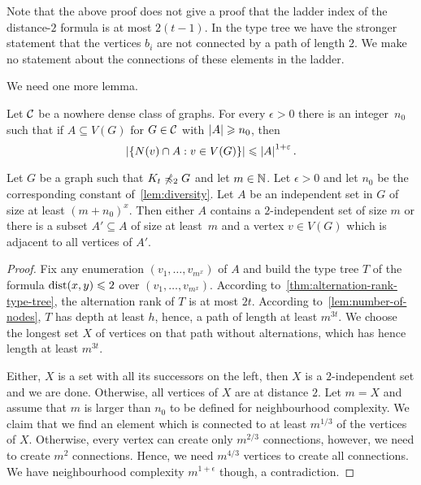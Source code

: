 Note that the above proof does not give a proof that the ladder
index of the distance-$2$ formula is at most $2(t-1)$. In the type
tree we have the stronger statement that the vertices $b_i$
are not connected by a path of length $2$. 
We make no statement about the connections
of these elements in the ladder. 

We need one more lemma. 

\begin{lemma}\label{lem:diversity}
  Let $\mathcal{C}$ be a nowhere dense class of graphs. For every
  $\epsilon>0$ there is an integer~$n_0$ such that if
  $A\subseteq V(G)$ for $G\in \mathcal{C}$ with $\left\lvert A\right\rvert\geqslant n_0$,
  then \[\left\lvert\{N(v)\cap A : v\in V(G)\}\right\rvert\leqslant \left\lvert A\right\rvert^{1+\varepsilon}.\]
\end{lemma}

\begin{lemma}
Let $G$ be a graph such that $K_t\not\preccurlyeq_2 G$ and let $m\in \mathbb{N}$. 
Let $\epsilon>0$ and let $n_0$ be the corresponding constant 
of~\cref{lem:diversity}.
Let $A$ be an independent set in $G$ of size at least $(m+n_0)^x$. 
Then either $A$ contains a $2$-independent set of size $m$ or
there is a subset $A'\subseteq A$ of size at least~$m$ and
a vertex $v\in V(G)$ which is adjacent to all vertices of $A'$. 
\end{lemma}
\begin{proof}
Fix any enumeration $(v_1,\ldots, v_{m^x})$ of $A$ and
build the type tree $T$ of the formula $\mathrm{dist}(x,y)\leqslant 2$ over
$(v_1,\ldots, v_{m^x})$. According to~\cref{thm:alternation-rank-type-tree}, 
the alternation rank of $T$ is at most $2t$. According 
to~\cref{lem:number-of-nodes}, $T$ has depth at least $h$, hence, 
a path of length at least $m^{3t}$. We choose the longest set $X$
of vertices on that path without alternations, which has hence length
at least $m^{3t}$. 

Either, $X$ is a set with all its successors on the left, then $X$ 
is a $2$-independent set and we are done.
Otherwise, all vertices of $X$ are at distance
$2$. Let $m=X$ and assume that $m$ is larger than $n_0$ to
be defined for neighbourhood complexity.
We claim that we find an element which is connected to at least $m^{1/3}$
of the vertices of $X$. Otherwise, every vertex
can create only $m^{2/3}$ connections, however, we need
to create $m^2$ connections. Hence, we need $m^{4/3}$ vertices
to create all connections. We have neighbourhood complexity
$m^{1+\epsilon}$ though, a contradiction. 

\end{proof}



